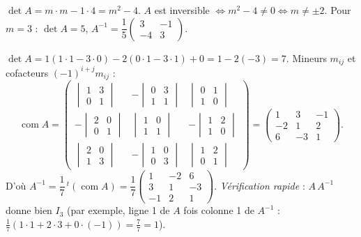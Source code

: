 $\det A=m\cdot m-1\cdot4=m^2-4$. $A$ est inversible $\iff m^2-4\neq0\iff m\neq\pm2$.
Pour $m=3$ : $\det A=5$, $A^{-1}=\dfrac15\begin{pmatrix}3&-1\\-4&3\end{pmatrix}$.

$\det A=1(1\cdot1-3\cdot0)-2(0\cdot1-3\cdot1)+0=1-2(-3)=7$.
Mineurs $m_{ij}$ et cofacteurs $(-1)^{i+j}m_{ij}$ :
\[
\operatorname{com}A=\begin{pmatrix}
\begin{vmatrix}1&3\\0&1\end{vmatrix} & -\begin{vmatrix}0&3\\1&1\end{vmatrix} & \begin{vmatrix}0&1\\1&0\end{vmatrix}\\[6pt]
-\begin{vmatrix}2&0\\0&1\end{vmatrix} & \begin{vmatrix}1&0\\1&1\end{vmatrix} & -\begin{vmatrix}1&2\\1&0\end{vmatrix}\\[6pt]
\begin{vmatrix}2&0\\1&3\end{vmatrix} & -\begin{vmatrix}1&0\\0&3\end{vmatrix} & \begin{vmatrix}1&2\\0&1\end{vmatrix}
\end{pmatrix}
=\begin{pmatrix}1&3&-1\\-2&1&2\\6&-3&1\end{pmatrix}.
\]
D'où $A^{-1}=\dfrac17\,{}^{t}(\operatorname{com}A)
=\dfrac17\begin{pmatrix}1&-2&6\\3&1&-3\\-1&2&1\end{pmatrix}$.
\emph{Vérification rapide} : $A\,A^{-1}$ donne bien $I_3$ (par exemple, ligne 1 de $A$ fois
colonne 1 de $A^{-1}$ : $\tfrac17(1\cdot1+2\cdot3+0\cdot(-1))=\tfrac77=1$).

